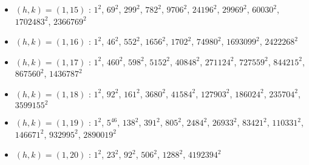 \begin{itemize}
\item $(h,k)=(1,15)$ : $1^{2}$, $69^{2}$, $299^{2}$, $782^{2}$, $9706^{2}$, $24196^{2}$, $29969^{2}$, $60030^{2}$, $1702483^{2}$, $2366769^{2}$
\item $(h,k)=(1,16)$ : $1^{2}$, $46^{2}$, $552^{2}$, $1656^{2}$, $1702^{2}$, $74980^{2}$, $1693099^{2}$, $2422268^{2}$
\item $(h,k)=(1,17)$ : $1^{2}$, $460^{2}$, $598^{2}$, $5152^{2}$, $40848^{2}$, $271124^{2}$, $727559^{2}$, $844215^{2}$, $867560^{2}$, $1436787^{2}$
\item $(h,k)=(1,18)$ : $1^{2}$, $92^{2}$, $161^{2}$, $3680^{2}$, $41584^{2}$, $127903^{2}$, $186024^{2}$, $235704^{2}$, $3599155^{2}$
\item $(h,k)=(1,19)$ : $1^{2}$, $5^{46}$, $138^{2}$, $391^{2}$, $805^{2}$, $2484^{2}$, $26933^{2}$, $83421^{2}$, $110331^{2}$, $146671^{2}$, $932995^{2}$, $2890019^{2}$
\item $(h,k)=(1,20)$ : $1^{2}$, $23^{2}$, $92^{2}$, $506^{2}$, $1288^{2}$, $4192394^{2}$

\end{itemize}
